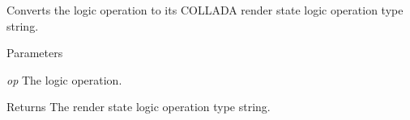 \label{namespaceFUDaePassStateLogicOperation_a4e918bedc26709acf27daf0925696411}
Converts the logic operation to its COLLADA render state logic operation type string. 
\begin{DoxyParams}{Parameters}
\item[{\em op}]The logic operation. \end{DoxyParams}
\begin{DoxyReturn}{Returns}
The render state logic operation type string. 
\end{DoxyReturn}
